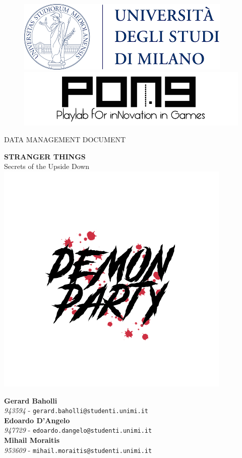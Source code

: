 \thispagestyle{empty}
{

	\begin{figure}
		\begin{minipage}{0.5\textwidth}
			\centering
			\includegraphics[width=0.6\linewidth]{images/logos/unimi_logo.png}
		\end{minipage}\hfill
		\begin{minipage}{0.5\textwidth}
			\centering
			\includegraphics[width=0.6\linewidth]{images/logos/pong_logo.png}
		\end{minipage}
	\end{figure}

	\vspace*{0.6cm}
	\begin{center}
		\Huge DATA MANAGEMENT DOCUMENT\\
	\end{center}
	
	\vspace{0.6cm}
	\begin{center}
		\Huge \textbf{STRANGER THINGS}\\
		\Huge {Secrets of the Upside Down}\\
		\includegraphics[width=0.7\linewidth]{images/logos/demonparty_logo.jpg}\\[4ex]
	\end{center}

	\vfill
	\textbf{Gerard Baholli}\\
	\textit{943594} - \texttt{gerard.baholli@studenti.unimi.it}\\
	
	\textbf{Edoardo D'Angelo}\\
	\textit{947729} - \texttt{edoardo.dangelo@studenti.unimi.it}\\
	
	\textbf{Mihail Moraitis}\\
	\textit{953609} - \texttt{mihail.moraitis@studenti.unimi.it}\\

}
